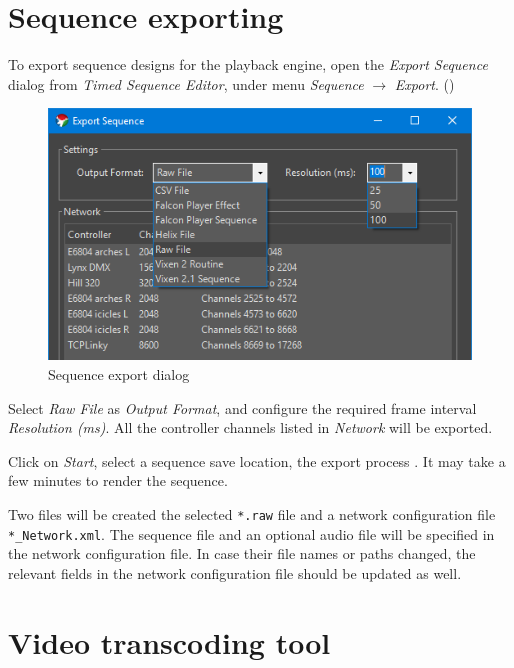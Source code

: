\renewcommand{\baselinestretch}{\mystretch}
\label{chap:Guide}

\section{Sequence exporting}

To export sequence designs for the playback engine, open the \textit{Export Sequence} dialog from \textit{Timed Sequence Editor}, under menu \textit{Sequence} $\rightarrow$ \textit{Export}. ()

\begin{figure}[!htb]
  \centering
  \includegraphics[width=0.75\columnwidth]{Figs/vixen_export.png}
  \caption{\footnotesize Sequence export dialog}
  \label{fig:guide_export}
\end{figure}

Select \textit{Raw File} as \textit{Output Format}, and configure the required frame interval  \textit{Resolution (ms)}. All the controller channels listed in \textit{Network} will be exported.

Click on \textit{Start}, select a sequence save location,  the export process . It may take a few minutes to render the sequence.

Two files will be created\cc{;} the selected \texttt{*.raw} file and a network configuration file \texttt{*\_Network.xml}. The sequence file and an optional audio file will be specified in the network configuration file. In case their file names or paths changed, the relevant fields in the network configuration file should be updated as well.

\section{Video transcoding tool}

